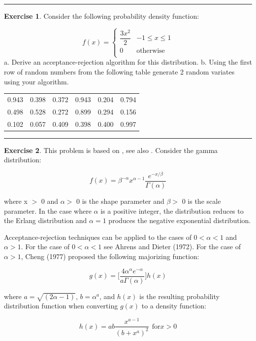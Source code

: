 \documentclass[
]{book}
\theoremstyle{definition}
\theoremstyle{definition}
\theoremstyle{definition}
\newtheorem{exercise}{Exercise}[chapter]
\theoremstyle{definition}
\theoremstyle{remark}
\begin{document}
\begin{center}\rule{0.5\linewidth}{0.5pt}\end{center}

\begin{exercise}
\protect\hypertarget{exr:AppRNRVP30}{}{\label{exr:AppRNRVP30} }Consider the following probability density function:
\end{exercise}
\[f(x) = 
  \begin{cases}
     \dfrac{3x^2}{2} & -1 \leq x \leq 1\\
     0 & \text{otherwise} \\
  \end{cases}\]
a. Derive an acceptance-rejection algorithm for this distribution.
b. Using the first row of random numbers from the following table generate 2 random variates using your algorithm.

\begin{longtable}[]{@{}cccccc@{}}
\toprule
\endhead
0.943 & 0.398 & 0.372 & 0.943 & 0.204 & 0.794 \\
0.498 & 0.528 & 0.272 & 0.899 & 0.294 & 0.156 \\
0.102 & 0.057 & 0.409 & 0.398 & 0.400 & 0.997 \\
\bottomrule
\end{longtable}

\begin{center}\rule{0.5\linewidth}{0.5pt}\end{center}

\begin{exercise}
\protect\hypertarget{exr:AppRNRVP31}{}{\label{exr:AppRNRVP31} }This problem is
based on \citep{cheng1977the}, see also \citep{ahrens1972computer}. Consider the
gamma distribution:

\[f(x) = \beta^{-\alpha} x^{\alpha-1} \dfrac{e^{-x/\beta}}{\Gamma(\alpha)}\]

where x \(>\) 0 and \(\alpha >\) 0 is the shape parameter and \(\beta >\) 0 is
the scale parameter. In the case where \(\alpha\) is a positive integer,
the distribution reduces to the Erlang distribution and \(\alpha = 1\)
produces the negative exponential distribution.

Acceptance-rejection techniques can be applied to the cases of
\(0 < \alpha < 1\) and \(\alpha > 1\). For the case of \(0 < \alpha < 1\) see
Ahrens and Dieter (1972). For the case of \(\alpha > 1\), Cheng (1977)
proposed the following majorizing function:

\[g(x) = \biggl[\dfrac{4 \alpha^\alpha e^{-\alpha}}{a \Gamma (\alpha)}\biggr] h(x)\]

where \(a = \sqrt{(2 \alpha - 1)}\), \(b = \alpha^a\), and \(h(x)\) is the
resulting probability distribution function when converting \(g(x)\) to a
density function:

\[h(x) = ab \dfrac{x^{a-1}}{(b + x^a)^2} \ \  \text{for} x > 0\]
\end{exercise}
\end{document}
